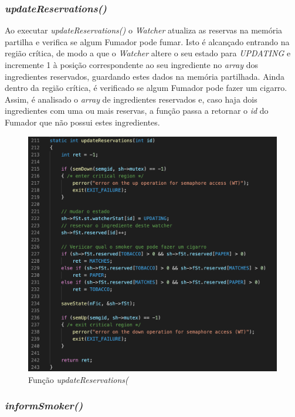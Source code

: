 \documentclass[10pt,portuguese]{article}
\begin{document}
\clearpage

\subsubsection{\textit{updateReservations()}}

\par Ao executar \textit{updateReservations()} o \textit{Watcher} atualiza as reservas na memória partilha e verifica se algum Fumador pode fumar. Isto é alcançado entrando na região crítica, de modo a que o \textit{Watcher} altere o seu estado para \textit{UPDATING} e incremente 1 à posição correspondente ao seu ingrediente no \textit{array} dos ingredientes reservados, guardando estes dados na memória partilhada. Ainda dentro da região crítica, é verificado se algum Fumador pode fazer um cigarro. Assim, é analisado o \textit{array} de ingredientes reservados e, caso haja dois ingredientes com uma ou mais reservas, a função passa a retornar o \textit{id} do Fumador que não possui estes ingredientes.

\begin{figure}[!h]
    \centering
    \includegraphics[width=\textwidth]{images/implementation/updateres.png}
    \caption{Função \textit{updateReservations(}}
\end{figure}

\clearpage

\subsubsection{\textit{informSmoker()}}
\end{document}
